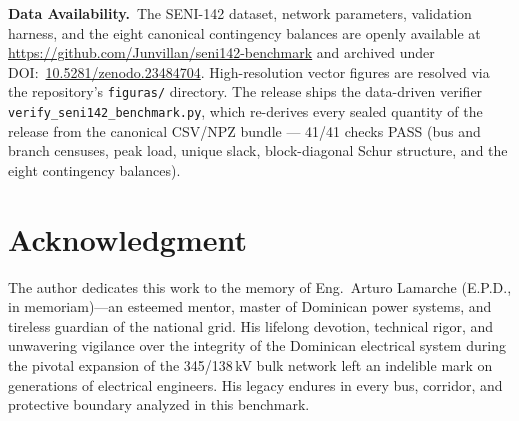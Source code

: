 \documentclass[10pt, journal]{IEEEtran}
\begin{document}





\noindent\textbf{Data Availability.}~The SENI-142 dataset, network parameters, validation harness, and the eight canonical contingency balances are openly available at \url{https://github.com/Junvillan/seni142-benchmark} and archived under DOI:~\href{https://doi.org/10.5281/zenodo.23484704}{10.5281/zenodo.23484704}. High-resolution vector figures are resolved via the repository's \texttt{figuras/} directory. The release ships the data-driven verifier \texttt{verify\_seni142\_benchmark.py}, which re-derives every sealed quantity of the release from the canonical CSV/NPZ bundle --- 41/41 checks PASS (bus and branch censuses, peak load, unique slack, block-diagonal Schur structure, and the eight contingency balances).


\section*{Acknowledgment}
The author dedicates this work to the memory of Eng.~Arturo Lamarche (E.P.D., in memoriam)---an esteemed mentor, master of Dominican power systems, and tireless guardian of the national grid. His lifelong devotion, technical rigor, and unwavering vigilance over the integrity of the Dominican electrical system during the pivotal expansion of the 345/138\,kV bulk network left an indelible mark on generations of electrical engineers. His legacy endures in every bus, corridor, and protective boundary analyzed in this benchmark.




\end{document}
